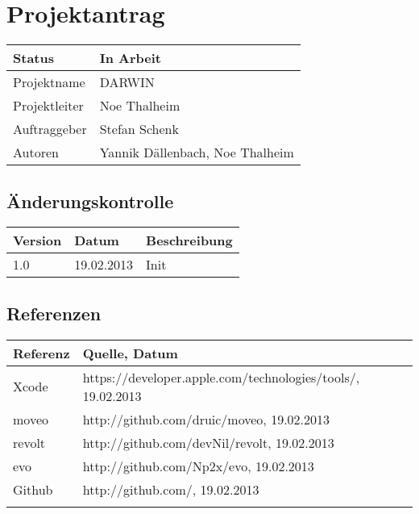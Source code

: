 \documentclass{scrartcl}
\begin{document}
	\section*{Projektantrag}
	
	\begin{tabularx}{\textwidth}{| X | X |}
	\hline
	Status & In Arbeit\\
	\hline
	Projektname & DARWIN\\
	\hline
	Projektleiter & Noe Thalheim\\
	\hline
	Auftraggeber & Stefan Schenk\\
	\hline
	Autoren & Yannik Dällenbach, Noe Thalheim\\
	\hline
	\end{tabularx}
	
	\subsection*{Änderungskontrolle}
	\begin{tabularx}{\textwidth}{| X | X | X |}
	\hline
	\rowcolor[gray]{0.9} Version & Datum & Beschreibung\\
	\hline
	1.0 & 19.02.2013 & Init\\
	\hline
	\end{tabularx}

	\subsection*{Referenzen}
	
	\begin{tabular}{| l | l | }
	\hline
	\rowcolor[gray]{0.9} Referenz & Quelle, Datum\\
	\hline
	Xcode & https://developer.apple.com/technologies/tools/, 19.02.2013\\
	\hline
	moveo & http://github.com/druic/moveo, 19.02.2013\\
	\hline
	revolt & http://github.com/devNil/revolt, 19.02.2013\\
	\hline
	evo & http://github.com/Np2x/evo, 19.02.2013\\
	\hline
	Github & http://github.com/, 19.02.2013\\
	\hline
	 & \\
	\hline
	\end{tabular}
	
	\pagebreak
	\tableofcontents
	\pagebreak
	
	
\end{document}
